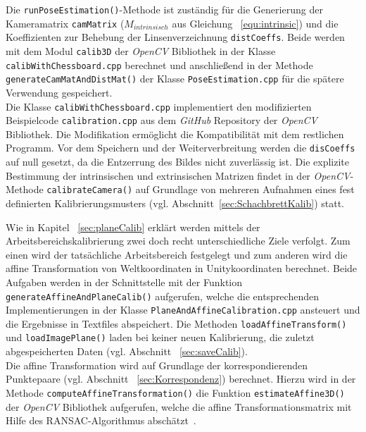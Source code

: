 Die \texttt{run\-Pose\-Estimation()}-Methode ist zuständig für die Generierung der Kameramatrix \texttt{camMatrix}  ($M_{intrinsisch}$ aus Gleichung ~\ref{equ:intrinsic})  und die Koeffizienten zur Behebung der Linsenverzeichnung \texttt{distCoeffs}. Beide werden mit dem Modul \texttt{calib3D} der \textit{OpenCV} Bibliothek in der Klasse \texttt{calib\-With\-Chess\-board.cpp} berechnet und anschließend in der Methode \texttt{generate\-Cam\-Mat\-And\-Dist\-Mat()} der Klasse \texttt{Pose\-Esti\-mation.cpp} für die spätere  Verwendung gespeichert. \\
Die Klasse \texttt{calib\-With\-Chess\-board.cpp} implementiert den modifizierten Beispielcode \texttt{calibration.cpp} \cite{website:calibexample} aus dem \textit{GitHub} Repository der \textit{OpenCV} Bibliothek. Die Modifikation ermöglicht die Kompatibilität mit dem restlichen Programm. Vor dem Speichern und der Weiterverbreitung werden die \texttt{disCoeffs} auf null gesetzt, da die Entzerrung des Bildes nicht zuverlässig ist. Die explizite Bestimmung der intrinsischen und extrinsischen Matrizen findet in der \textit{OpenCV}-Methode \texttt{calibrate\-Camera()} auf Grundlage von mehreren Aufnahmen eines fest definierten Kalibrierungsmusters (vgl. Abschnitt~\ref{sec:SchachbrettKalib}) statt.

Wie in Kapitel ~\ref{sec:planeCalib} erklärt werden mittels der Arbeitsbereichskalibrierung zwei doch recht unterschiedliche Ziele verfolgt. Zum einen wird der tatsächliche Arbeitsbereich festgelegt und zum anderen wird die affine Transformation von Weltkoordinaten in Unitykoordinaten berechnet. Beide Aufgaben werden in der Schnittstelle mit der Funktion \texttt{generate\-Affine\-And\-Plane\-Calib()} aufgerufen, welche die entsprechenden Implementierungen in der Klasse \texttt{Plane\-And\-Affine\-Calibration.cpp} ansteuert und die Ergebnisse in Textfiles abspeichert. Die Methoden \texttt{load\-Affine\-Transform()} und \texttt{load\-Image\-Plane()} laden bei keiner neuen Kalibrierung, die zuletzt abgespeicherten Daten (vgl. Abschnitt ~\ref{sec:saveCalib}). \\

Die affine Transformation wird auf Grundlage der korrespondierenden Punktepaare (vgl. Abschnitt ~\ref{sec:Korrespondenz}) berechnet. Hierzu wird in der Methode \texttt{compute\-Affine\-Trans\-formation()} die Funktion \texttt{estimate\-Affine\-3D()} der \textit{OpenCV} Bibliothek aufgerufen, welche die affine Transformationsmatrix mit Hilfe des RANSAC-Algorithmus abschätzt~\cite{articel:RANSAC}.

